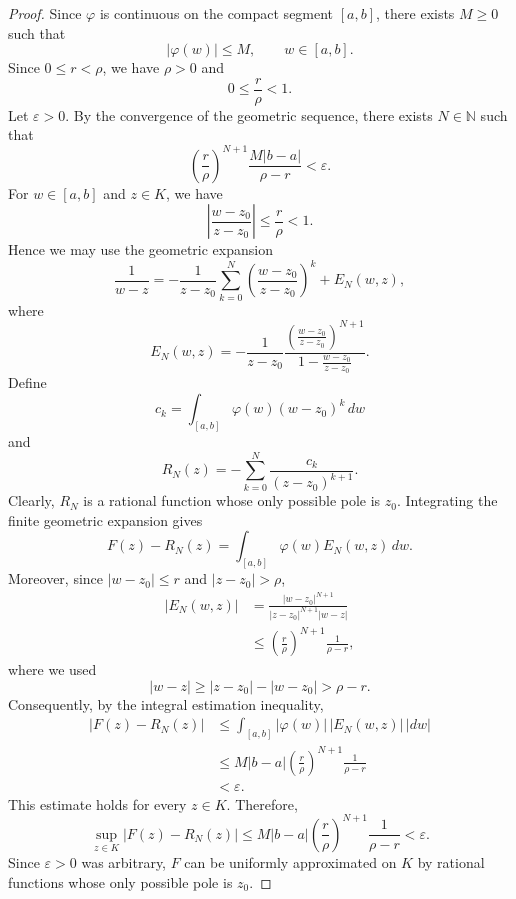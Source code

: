 \documentclass[11pt]{article}
\begin{document}
\begin{proof}
Since $\varphi$ is continuous on the compact segment $[a,b]$,
there exists $M\geq 0$ such that
\[
    |\varphi(w)|\leq M,
    \qquad w\in[a,b].
\]
Since $0\leq r<\rho$, we have $\rho>0$ and
\[
    0\leq\frac{r}{\rho}<1.
\]
Let $\varepsilon>0$. By the convergence of the geometric
sequence, there exists $N\in\mathbb{N}$ such that
\[
    \left(\frac{r}{\rho}\right)^{N+1}
    \frac{M|b-a|}{\rho-r}<\varepsilon.
\]
For $w\in[a,b]$ and $z\in K$, we have
\[
    \left|\frac{w-z_0}{z-z_0}\right|
    \leq\frac{r}{\rho}<1.
\]
Hence we may use the geometric expansion
\[
    \frac{1}{w-z}
    =-\frac{1}{z-z_0}
    \sum_{k=0}^{N}
    \left(\frac{w-z_0}{z-z_0}\right)^k
    +E_N(w,z),
\]
where
\[
    E_N(w,z)
    =-\frac{1}{z-z_0}
    \frac{\left(\frac{w-z_0}{z-z_0}\right)^{N+1}}
         {1-\frac{w-z_0}{z-z_0}}.
\]
Define
\[
    c_k=\int_{[a,b]}\varphi(w)(w-z_0)^k\,dw
\]
and
\[
    R_N(z)
    =-\sum_{k=0}^{N}\frac{c_k}{(z-z_0)^{k+1}}.
\]
Clearly, $R_N$ is a rational function whose only possible
pole is $z_0$.
Integrating the finite geometric expansion gives
\[
    F(z)-R_N(z)
    =\int_{[a,b]}\varphi(w)E_N(w,z)\,dw.
\]
Moreover, since $|w-z_0|\leq r$ and $|z-z_0|>\rho$,
\begin{align*}
    |E_N(w,z)|
    &=\frac{|w-z_0|^{N+1}}
    {|z-z_0|^{N+1}|w-z|}\\
    &\leq
    \left(\frac{r}{\rho}\right)^{N+1}
    \frac{1}{\rho-r},
\end{align*}
where we used
\[
    |w-z|
    \geq |z-z_0|-|w-z_0|
    >\rho-r.
\]
Consequently, by the integral estimation inequality,
\begin{align*}
    |F(z)-R_N(z)|
    &\leq\int_{[a,b]}
       |\varphi(w)|\,|E_N(w,z)|\,|dw|\\
    &\leq
    M|b-a|
    \left(\frac{r}{\rho}\right)^{N+1}
    \frac{1}{\rho-r}\\
    &<\varepsilon.
\end{align*}
This estimate holds for every $z\in K$. Therefore,
\[
    \sup_{z\in K}|F(z)-R_N(z)|
    \leq
    M|b-a|
    \left(\frac{r}{\rho}\right)^{N+1}
    \frac{1}{\rho-r}
    <\varepsilon.
\]
Since $\varepsilon>0$ was arbitrary, $F$ can be
uniformly approximated on $K$ by rational functions
whose only possible pole is $z_0$.
\end{proof}
\end{document}
